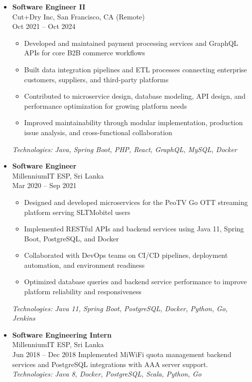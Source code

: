 \documentclass[a4paper,10pt]{article}
\begin{document}
\begin{itemize}
    \item \textbf{Software Engineer II} \\
          Cut+Dry Inc, San Francisco, CA (Remote) \\
          Oct 2021 -- Oct 2024
          \begin{itemize}[leftmargin=0.25in,label=$\circ$,itemsep=1pt]
              \item Developed and maintained payment processing services and GraphQL APIs for core B2B commerce workflows
              \item Built data integration pipelines and ETL processes connecting enterprise customers, suppliers, and third-party platforms
              \item Contributed to microservice design, database modeling, API design, and performance optimization for growing platform needs
              \item Improved maintainability through modular implementation, production issue analysis, and cross-functional collaboration
          \end{itemize}
          \textit{Technologies: Java, Spring Boot, PHP, React, GraphQL, MySQL, Docker}
          
    \item \textbf{Software Engineer} \\
          MillenniumIT ESP, Sri Lanka \\
          Mar 2020 -- Sep 2021
          \begin{itemize}[leftmargin=0.25in,label=$\circ$,itemsep=1pt]
              \item Designed and developed microservices for the PeoTV Go OTT streaming platform serving SLTMobitel users
              \item Implemented RESTful APIs and backend services using Java 11, Spring Boot, PostgreSQL, and Docker
              \item Collaborated with DevOps teams on CI/CD pipelines, deployment automation, and environment readiness
              \item Optimized database queries and backend service performance to improve platform reliability and responsiveness
          \end{itemize}
          \textit{Technologies: Java 11, Spring Boot, PostgreSQL, Docker, Python, Go, Jenkins}
          
    \item \textbf{Software Engineering Intern} \\
          MillenniumIT ESP, Sri Lanka \\
          Jun 2018 -- Dec 2018
          Implemented MiWiFi quota management backend services and PostgreSQL integrations with AAA server support. \\
          \textit{Technologies: Java 8, Docker, PostgreSQL, Scala, Python, Go}
\end{itemize}
\end{document}
